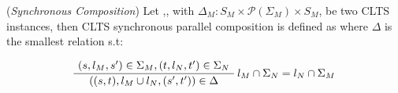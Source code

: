 \begin{definition} 
	\label{def:synchronous_composition}(\emph{Synchronous Composition}) Let ,, with $\Delta_M : S_M \times \mathcal{P}(\Sigma_M) \times S_M$, be two CLTS instances, then CLTS synchronous parallel composition is defined as  where $\Delta$ is the smallest relation s.t:
	\begin{center}
		\begin{equation}
		\AxiomC{$(s, l_M, s') \in \Sigma_M,(t, l_N, t') \in \Sigma_N  $}\RightLabel{$l_M \cap \Sigma_N = l_N \cap \Sigma_M$}
		\UnaryInfC{$((s,t),l_M \cup l_N,(s',t')) \in \Delta$}
		\DisplayProof
		\end{equation}	
	\end{center}
\end{definition}


%		 
%		 
